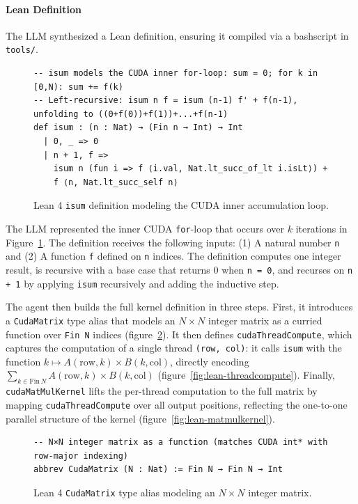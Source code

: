 \documentclass{article}
\begin{document}
\paragraph{Lean Definition}

The LLM synthesized a Lean definition, ensuring it compiled via a bashscript in \texttt{tools/}.

\begin{figure}[H]
\begin{verbatim}
-- isum models the CUDA inner for-loop: sum = 0; for k in [0,N): sum += f(k)
-- Left-recursive: isum n f = isum (n-1) f' + f(n-1), unfolding to ((0+f(0))+f(1))+...+f(n-1)
def isum : (n : Nat) → (Fin n → Int) → Int
  | 0, _ => 0
  | n + 1, f =>
    isum n (fun i => f ⟨i.val, Nat.lt_succ_of_lt i.isLt⟩) +
    f ⟨n, Nat.lt_succ_self n⟩
\end{verbatim}
\caption{Lean 4 \texttt{isum} definition modeling the CUDA inner accumulation loop.}
\label{fig:lean-isum}
\end{figure}

The LLM represented the inner CUDA \texttt{for}-loop that occurs over $k$ iterations in Figure~\ref{fig:lean-isum}. The definition receives the following inputs: (1) A natural number \texttt{n} and (2) A function \texttt{f} defined on \texttt{n} indices. The definition computes one integer result, is recursive with a base case that returns 0 when \texttt{n = 0}, and recurses on \texttt{n + 1} by applying \texttt{isum} recursively and adding the inductive step.

The agent then builds the full kernel definition in three steps. First, it introduces a \texttt{CudaMatrix} type alias that models an $N \times N$ integer matrix as a curried function over \texttt{Fin N} indices (figure~\ref{fig:lean-cudamatrix}). It then defines \texttt{cudaThreadCompute}, which captures the computation of a single thread \texttt{(row, col)}: it calls \texttt{isum} with the function $k \mapsto A(\mathrm{row}, k) \times B(k, \mathrm{col})$, directly encoding $\sum_{k \in \text{Fin}\,N} A(\mathrm{row}, k) \times B(k, \mathrm{col})$ (figure~\ref{fig:lean-threadcompute}). Finally, \texttt{cudaMatMulKernel} lifts the per-thread computation to the full matrix by mapping \texttt{cudaThreadCompute} over all output positions, reflecting the one-to-one parallel structure of the kernel (figure~\ref{fig:lean-matmulkernel}).

\begin{figure}[H]
\begin{verbatim}
-- N×N integer matrix as a function (matches CUDA int* with row-major indexing)
abbrev CudaMatrix (N : Nat) := Fin N → Fin N → Int
\end{verbatim}
\caption{Lean 4 \texttt{CudaMatrix} type alias modeling an $N \times N$ integer matrix.}
\label{fig:lean-cudamatrix}
\end{figure}
\end{document}
